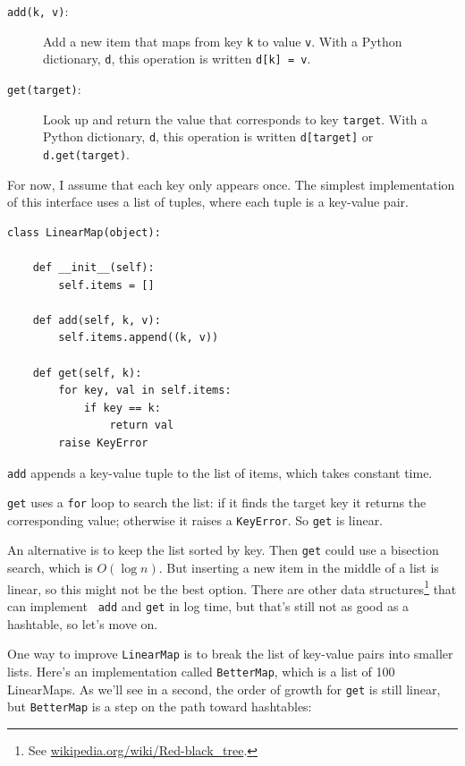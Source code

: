 \documentclass[10pt]{book}
\begin{document}
\begin{description}

\item[{\tt add(k, v)}:] Add a new item that maps from key {\tt k}
to value {\tt v}.  With a Python dictionary, {\tt d}, this operation
is written {\tt d[k] = v}.

\item[{\tt get(target)}:] Look up and return the value that corresponds
to key {\tt target}.  With a Python dictionary, {\tt d}, this operation
is written {\tt d[target]} or {\tt d.get(target)}.

\end{description}

For now, I assume that each key only appears once.
The simplest implementation of this interface uses a list of
tuples, where each tuple is a key-value pair.

\begin{verbatim}
class LinearMap(object):

    def __init__(self):
        self.items = []

    def add(self, k, v):
        self.items.append((k, v))

    def get(self, k):
        for key, val in self.items:
            if key == k:
                return val
        raise KeyError
\end{verbatim}

{\tt add} appends a key-value tuple to the list of items, which
takes constant time.

{\tt get} uses a {\tt for} loop to search the list:
if it finds the target key it returns the corresponding value;
otherwise it raises a {\tt KeyError}.
So {\tt get} is linear.

An alternative is to keep the list sorted by key.  Then {\tt get}
could use a bisection search, which is $O(\log n)$.  But inserting a
new item in the middle of a list is linear, so this might not be the
best option.  There are other data structures\footnote{See
  \url{wikipedia.org/wiki/Red-black_tree}.}  that can implement {\tt
  add} and {\tt get} in log time, but that's still not as good as a
hashtable, so let's move on.

One way to improve {\tt LinearMap} is to break the list of key-value
pairs into smaller lists.  Here's an implementation called
{\tt BetterMap}, which is a list of 100 LinearMaps.  As we'll see
in a second, the order of growth for {\tt get} is still linear,
but {\tt BetterMap} is a step on the path toward hashtables:
\end{document}
